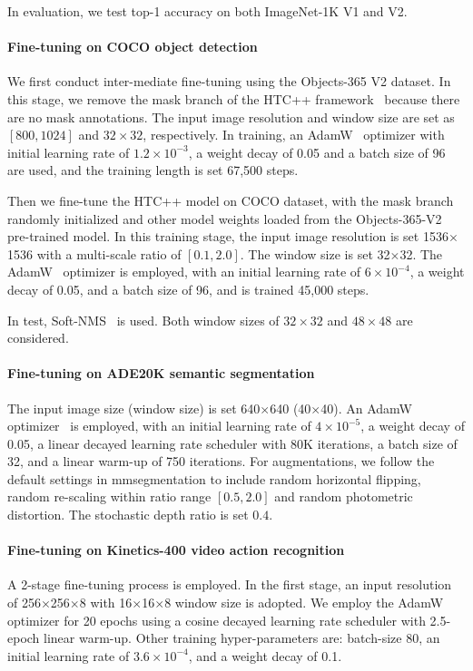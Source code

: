 \documentclass[10pt,twocolumn,letterpaper]{article}
\begin{document}
In evaluation, we test top-1 accuracy on both ImageNet-1K V1 and V2.

\paragraph{Fine-tuning on COCO object detection}
We first conduct inter-mediate fine-tuning using the Objects-365 V2 dataset. In this stage, we remove the mask branch of the HTC++ framework~\cite{chen2019htc,liu2021swin} because there are no mask annotations. The input image resolution and window size are set as $[800, 1024]$ and $32\times 32$, respectively. In training, an  AdamW~\cite{loshchilov2017decoupled} optimizer with initial learning rate of $1.2\times10^{-3}$, a weight decay of 0.05 and a batch size of 96 are used, and the training length is set 67,500 steps.

Then we fine-tune the HTC++ model on COCO dataset, with the mask branch randomly initialized and other model weights loaded from the Objects-365-V2 pre-trained model. In this training stage, the input image resolution is set 1536$\times$1536 with a multi-scale ratio of $[0.1, 2.0]$. The window size is set 32$\times$32. The  AdamW~\cite{loshchilov2017decoupled} optimizer is employed, with an initial learning rate of $6\times10^{-4}$, a weight decay of 0.05, and a batch size of 96, and is trained 45,000 steps.

In test, Soft-NMS~\cite{Bodla2017softnms} is used. Both window sizes of $32\times32$ and $48\times 48$ are considered.
 
\paragraph{Fine-tuning on ADE20K semantic segmentation}
The input image size (window size) is set 640$\times$640 (40$\times$40). An AdamW optimizer~\cite{loshchilov2017decoupled} is employed, with an initial learning rate of $4\times10^{-5}$, a weight decay of 0.05, a linear decayed learning rate scheduler with 80K iterations, a batch size of 32, and a linear warm-up of 750 iterations. For augmentations, we follow the default settings in mmsegmentation to include random horizontal flipping, random re-scaling within ratio range $[0.5, 2.0]$ and random photometric distortion. The stochastic depth ratio is set $0.4$. 


\paragraph{Fine-tuning on Kinetics-400 video action recognition}
A 2-stage fine-tuning process is employed. In the first stage, an input resolution of 256$\times$256$\times$8 with 16$\times$16$\times$8 window size is adopted. We employ the AdamW optimizer for 20 epochs using a cosine decayed learning rate scheduler with 2.5-epoch linear warm-up. Other training hyper-parameters are: batch-size 80, an initial learning rate of $3.6\times10^{-4}$, and a weight decay of 0.1.
\end{document}
